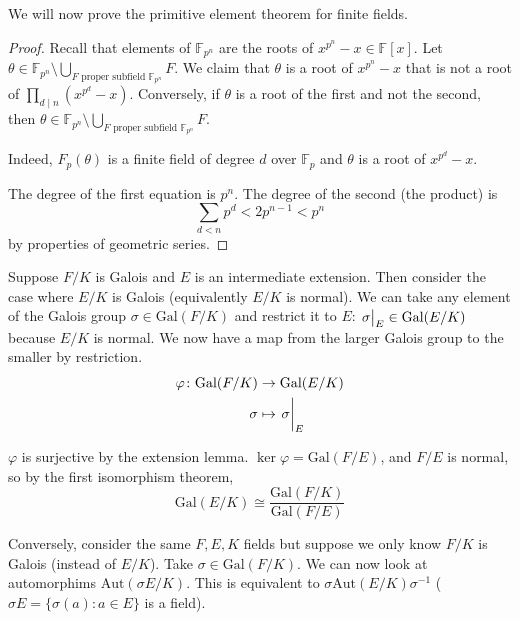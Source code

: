 \documentclass[a4paper,twoside,master.tex]{subfiles}
\begin{document}

We will now prove the primitive element theorem for finite fields.
\begin{proof}
    Recall that elements of $ \mathbb{F}_{p^n} $ are the roots of $ x^{p^n} - x \in \mathbb{F}[x] $. Let $ \theta \in \mathbb{F}_{p^n} \setminus \bigcup_{F \text{ proper subfield } \mathbb{F}_{p^n}} F $. We claim that $ \theta $ is a root of $ x^{p^n} - x $ that is not a root of $ \prod_{d\mid n} (x^{p^d} - x) $. Conversely, if $ \theta $ is a root of the first and not the second, then $ \theta \in \mathbb{F}_{p^n} \setminus \bigcup_{F \text{ proper subfield } \mathbb{F}_{p^n}} F $.

    Indeed, $ F_p(\theta) $ is a finite field of degree $ d $ over $ \mathbb{F}_p $ and $\theta$ is a root of $ x^{p^d} - x $.

    The degree of the first equation is $ p^n $. The degree of the second (the product) is
    \begin{equation}
        \sum_{d<n} p^d < 2 p^{n-1} < p^n
    \end{equation}
    by properties of geometric series.
\end{proof}

Suppose $ F/K $ is Galois and $ E $ is an intermediate extension. Then consider the case where $ E/K $ is Galois (equivalently $ E/K $ is normal). We can take any element of the Galois group $ \sigma \in \text{Gal}(F/K) $ and restrict it to $ E $: $ \eval{\sigma}_{E} \in \text{Gal}(E/K) $ because $ E/K $ is normal. We now have a map from the larger Galois group to the smaller by restriction.
\begin{align}
    \varphi \colon \text{Gal}(F/K) &\to \text{Gal}(E/K) \\
    \sigma &\mapsto \eval{\sigma}_{E}
\end{align}

$ \varphi $ is surjective by the extension lemma. $ \ker \varphi = \text{Gal}(F/E) $, and $ F/E $ is normal, so by the first isomorphism theorem,
\begin{equation}
    \text{Gal}(E/K) \cong \frac{\text{Gal}(F/K)}{\text{Gal}(F/E)}
\end{equation}

Conversely, consider the same $ F,E,K $ fields but suppose we only know $ F/K $ is Galois (instead of $ E/K $). Take $ \sigma \in \text{Gal}(F/K) $. We can now look at automorphims $ \text{Aut}(\sigma E/K) $. This is equivalent to $ \sigma \text{Aut}(E/K) \sigma^{-1} $ ($ \sigma E = \{\sigma(a) \colon a \in E\} $ is a field).
\end{document}
